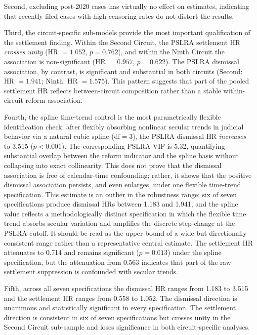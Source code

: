 Second, excluding post-2020 cases has virtually no effect on
estimates, indicating that recently filed cases with high
censoring rates do not distort the results.

Third, the circuit-specific sub-models provide the most
important qualification of the settlement finding. Within
the Second Circuit, the PSLRA settlement HR \emph{crosses
unity} (HR $= 1.052$, $p = 0.762$), and within the Ninth
Circuit the association is non-significant
(HR $= 0.957$, $p = 0.622$). The PSLRA dismissal
association, by contrast, is significant and substantial in
both circuits (Second: HR $= 1.941$; Ninth:
HR $= 1.575$). This pattern suggests that part of the pooled
settlement HR reflects between-circuit composition rather
than a stable within-circuit reform association.

Fourth, the spline time-trend control is the most
parametrically flexible identification check: after
flexibly absorbing nonlinear
secular trends in judicial behavior via a natural cubic
spline ($\text{df} = 3$), the PSLRA dismissal HR
\emph{increases} to 3.515 ($p < 0.001$). The corresponding
PSLRA VIF is 5.32, quantifying substantial overlap between
the reform indicator and the spline basis without collapsing
into exact collinearity. This does not prove
that the dismissal association is free of calendar-time
confounding; rather, it shows that the positive dismissal
association persists, and even enlarges, under one flexible
time-trend specification.
This estimate is an outlier in the robustness range: six of
seven specifications produce dismissal HRs between 1.183
and 1.941, and the spline value reflects a methodologically
distinct specification in which the flexible time trend
absorbs secular variation and amplifies the discrete
step-change at the PSLRA cutoff. It should be read as the
upper bound of a wide but directionally consistent range
rather than a representative central estimate.
The settlement HR attenuates to 0.714 and remains significant
($p = 0.013$) under the spline specification, but the
attenuation from 0.563 indicates that part of the raw
settlement suppression is confounded with secular trends.

Fifth, across all seven specifications the dismissal HR
ranges from 1.183 to 3.515 and the settlement HR ranges from
0.558 to 1.052. The dismissal direction is unanimous and
statistically significant in every specification. The
settlement direction is consistent in six of seven
specifications but crosses unity in the Second Circuit
sub-sample and loses significance in both circuit-specific
analyses.

